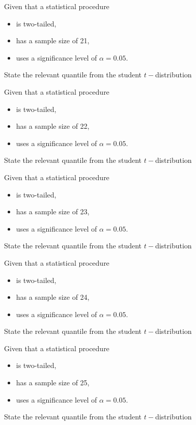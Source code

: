 \documentclass[12pt, a4paper]{report}
\theoremstyle{definition}
\theoremstyle{remark}
\begin{document}
	
	
	
	Given that a statistical procedure
	\begin{itemize}
		\item is two-tailed,
		\item has a sample size of 21,
		\item uses a significance level of $\alpha = 0.05$.
	\end{itemize} \smallskip
	State the relevant quantile from the student $t-$distribution
	


	
	
	
	Given that a statistical procedure 
	\begin{itemize}
		\item is two-tailed,
		\item has a sample size of 22,
		\item uses a significance level of $\alpha = 0.05$.
	\end{itemize} \smallskip
	State the relevant quantile from the student $t-$distribution
	


	
	
	
	Given that a statistical procedure 
	\begin{itemize}
		\item is two-tailed,
		\item has a sample size of 23,
		\item uses a significance level of $\alpha = 0.05$.
	\end{itemize} \smallskip
	State the relevant quantile from the student $t-$distribution
	


	
	
	
	Given that a statistical procedure
	\begin{itemize}
		\item is two-tailed,
		\item has a sample size of 24,
		\item uses a significance level of $\alpha = 0.05$.
	\end{itemize} \smallskip
	State the relevant quantile from the student $t-$distribution
	


	
	
	
	Given that a statistical procedure 
	\begin{itemize}
		\item is two-tailed,
		\item has a sample size of 25,
		\item uses a significance level of $\alpha = 0.05$.
	\end{itemize} \smallskip
	State the relevant quantile from the student $t-$distribution
	
\end{document}
